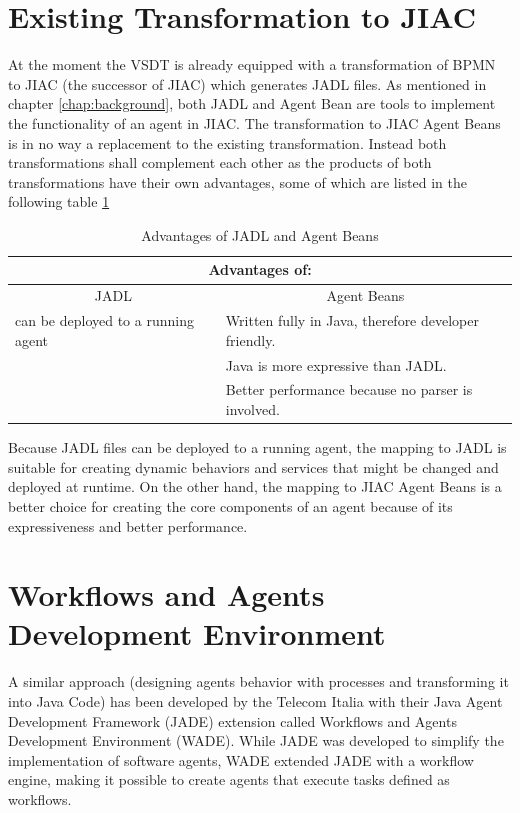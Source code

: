 \section{Existing Transformation to JIAC}
At the moment the VSDT is already equipped with a transformation of BPMN to JIAC (the successor of JIAC) which generates JADL files.
As mentioned in chapter \ref{chap:background}, both JADL and Agent Bean are tools to implement the functionality of an agent in JIAC. 
The transformation to JIAC Agent Beans is in no way a replacement to the existing transformation. Instead both transformations shall complement each other as the products of both transformations have their own advantages, some of which are listed in the following table \ref{tab:benefits}
\begin{table}[htbp]
	\centering
		\begin{tabularx}{\linewidth}{|l|X|}\hline\hline
			\multicolumn{2}{|c|}{\textbf{Advantages of:}} \\\hline
			\multicolumn{1}{|c|}{JADL} & \multicolumn{1}{c|}{Agent Beans}\\\hline
			can be deployed to a running agent &  Written fully in Java, therefore developer friendly.\\
																				 &  Java is more expressive than JADL.\\
			                           				 &  Better performance because no parser is involved.\\\hline\hline
		\end{tabularx}
		\caption{Advantages of JADL and Agent Beans}
		\label{tab:benefits}
\end{table}

\newpage
Because JADL files can be deployed to a running agent, the mapping to JADL is suitable for creating dynamic behaviors and services that might be changed and deployed at runtime. On the other hand, the mapping to JIAC Agent Beans is a better choice for creating the core components of an agent because of its expressiveness and better performance. 


\section{Workflows and Agents Development Environment}
\label{sec:wade}
A similar approach (designing agents behavior with processes and transforming it into Java Code) has been developed by the Telecom Italia with their Java Agent Development Framework (JADE) extension called Workflows and Agents Development Environment (WADE). While JADE was developed to simplify the implementation of software agents, WADE extended JADE with a workflow engine, making it possible to create agents that execute tasks defined as workflows.

